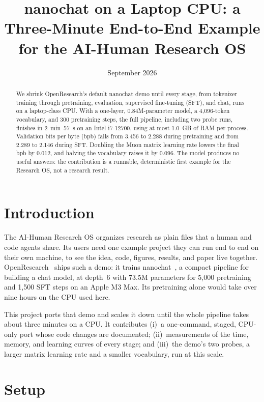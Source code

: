 \documentclass[11pt]{article}
\title{nanochat on a Laptop CPU: a Three-Minute End-to-End Example\\for the AI-Human Research OS}
\author{}
\date{September 2026}
\begin{document}
\maketitle

\begin{abstract}
We shrink OpenResearch's default nanochat demo until every stage, from
tokenizer training through pretraining, evaluation, supervised fine-tuning
(SFT), and chat, runs on a laptop-class CPU. With a one-layer,
0.84M-parameter model, a 4{,}096-token vocabulary, and 300 pretraining steps,
the full pipeline, including two probe runs, finishes in 2~min~57~s on an Intel
i7-12700, using at most 1.0~GB of RAM per process. Validation bits per byte
(bpb) falls from 3.456 to 2.288 during pretraining and from 2.289 to 2.146
during SFT. Doubling the Muon matrix learning rate lowers the final bpb by
0.012, and halving the vocabulary raises it by 0.096. The model produces no
useful answers: the contribution is a runnable, deterministic first example
for the Research OS, not a research result.
\end{abstract}

\section{Introduction}

The AI-Human Research OS organizes research as plain files that a human and
code agents share. Its users need one example project they can run end to end
on their own machine, to see the idea, code, figures, results, and paper live
together. OpenResearch~\cite{alphaxiv2026openresearch} ships such a demo: it
trains nanochat~\cite{karpathy2025nanochat}, a compact pipeline for building a
chat model, at depth~6 with 73.5M parameters for 5{,}000 pretraining and
1{,}500 SFT steps on an Apple M3 Max. Its pretraining alone would take over
nine hours on the CPU used here.

This project ports that demo and scales it down until the whole pipeline takes
about three minutes on a CPU. It contributes (i)~a one-command, staged,
CPU-only port whose code changes are documented; (ii)~measurements of the
time, memory, and learning curves of every stage; and (iii)~the demo's two
probes, a larger matrix learning rate and a smaller vocabulary, run at this
scale.

\section{Setup}
\end{document}
